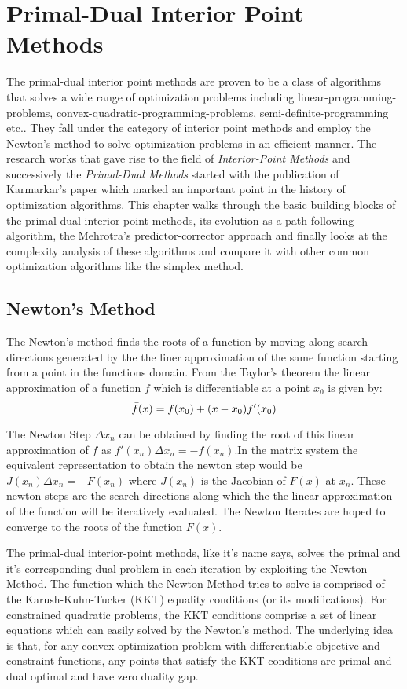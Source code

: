 \chapter{Primal-Dual Interior Point Methods}\label{chapter:PDIPM}
\par The primal-dual interior point methods are proven to be a class of algorithms that solves a wide range of optimization problems including linear-programming-problems, convex-quadratic-programming-problems, semi-definite-programming etc.\cite{wright1997primal}. They fall under the category of interior point methods and employ the Newton's method to solve optimization problems in an efficient manner. The research works that gave rise to the field of \textit{Interior-Point Methods} and successively the \textit{Primal-Dual Methods} started with the publication of Karmarkar's paper \cite{karmarkar1984new} which marked an important point in the history of optimization algorithms. This chapter walks through the basic building blocks of the primal-dual interior point methods, its evolution as a path-following algorithm, the Mehrotra's predictor-corrector approach and finally looks at the complexity analysis of these algorithms and compare it with other common optimization algorithms like the simplex method.
\section{Newton's Method}\label{NM}
\par The Newton's method finds the roots of a function by moving along search directions generated by the the liner approximation of the same function starting from a point in the functions domain. From the Taylor's theorem \cite{apostol1964mathematical} the linear approximation of a function \(f\) which is differentiable at a point \(x_0\) is given by:
\begin{equation}\label{lin appx}
\Bar{f}(x)=f(x_0)+(x-x_0)f'(x_0)
\end{equation}
\par The Newton Step \( \Delta x_n\) can be obtained by finding the root of this linear approximation of \(f\) as $f'(x_n) \Delta x_n=-f(x_n)$.In the matrix system the equivalent representation to obtain the newton step would be {\(J(x_n) \Delta x_n=-F(x_n)\)} where \(J(x_n)\) is the Jacobian of \(F(x)\) at \(x_n\). These newton steps are the search directions along which the the linear approximation of the function will be iteratively evaluated. The Newton Iterates are hoped to converge to the roots of the function \(F(x)\)\cite{apostol1964mathematical}. \par
The primal-dual interior-point methods, like it's name says, solves the primal and it's corresponding dual problem in each iteration by exploiting the Newton Method. The function which the Newton Method tries to solve is comprised of the Karush-Kuhn-Tucker (KKT) equality conditions (or its modifications). For constrained quadratic problems, the KKT conditions comprise a set of linear equations which can easily solved by the Newton's method. The underlying idea is that, for any convex optimization problem with differentiable objective and constraint functions, any points that satisfy the KKT conditions are primal and dual optimal and have zero duality gap\cite{boyd2004convex}. 
